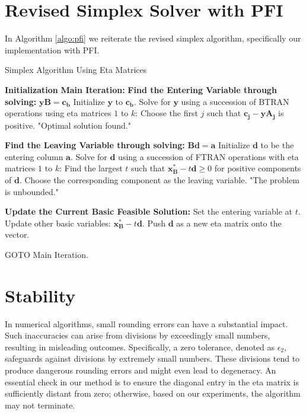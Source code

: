 \section{Revised Simplex Solver with PFI}
In Algorithm \ref{algo:pfi} we reiterate the revised simplex algorithm, specifically our implementation with PFI.
\begin{algorithm}
    \caption{Simplex Algorithm Using Eta Matrices}
    \begin{algorithmic}
        \State \textbf{Initialization}
        \State \textbf{Main Iteration:}
        \State \textbf{Find the Entering Variable through solving:} $\mathbf{yB} = \mathbf{c_b}$
        \State Initialize \(\mathbf{y}\) to \(\mathbf{c_b}\).
        \State Solve for \(\mathbf{y}\) using a succession of BTRAN operations using
        eta matrices \(1\) to \(k\):
        \State Choose the first \(j\) such that \(\mathbf{c_j} - \mathbf{yA_j}\) is positive.
        \State \Return "Optimal solution found."
        \EndIf

        \State \textbf{Find the Leaving Variable through solving:} $\mathbf{Bd} =\mathbf{a}$
        \State Initialize \(\mathbf{d}\) to be the entering column \(\mathbf{a}\).
        \State Solve for \(\mathbf{d}\) using a succession of FTRAN operations with
        eta matrices \(1\) to \(k\):
        \State Find the largest $t$ such that \( \mathbf{x_B^{\ast}} - t\mathbf{d} \geq 0\) 
        for positive components of \(\mathbf{d}\). Choose the corresponding component as the leaving variable.
        \State \Return "The problem is unbounded."
        \EndIf

        \State \textbf{Update the Current Basic Feasible Solution:}
        \State Set the entering variable at \(t\).
        \State Update other basic variables: \(\mathbf{x^*_B} - t\mathbf{d}\).
        \State Push \(\mathbf{d}\) as a new eta matrix onto the vector.

        \State GOTO Main Iteration.
    \end{algorithmic}
    \label{algo:pfi}
\end{algorithm}

\section{Stability}\label{stability}
In numerical algorithms, small rounding errors can have a substantial impact. 
Such inaccuracies can arise from divisions by exceedingly small numbers, 
resulting in misleading outcomes.
Specifically, a zero tolerance, denoted as $\epsilon_2$, safeguards against divisions
 by extremely small numbers. These divisions tend to produce dangerous rounding errors
  and might even lead to degeneracy. An essential check in our method is to 
  ensure the diagonal entry in the eta matrix is sufficiently distant from zero; 
  otherwise, based on our experiments, the algorithm may not terminate. 

